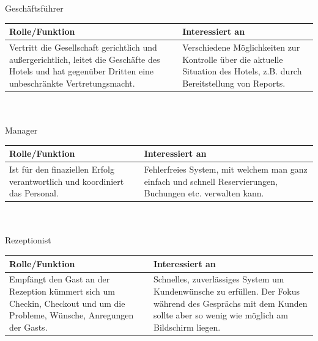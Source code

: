 \documentclass[10pt,a4paper,titlepage]{article}
\begin{document}
Geschäftsführer\\
\begin{tabular}[t]{|p{5cm}|p{5cm}|}
    \hline
    \textbf{Rolle\slash{}Funktion} & \textbf{Interessiert an} \\
    \hline
Vertritt die Gesellschaft gerichtlich und außergerichtlich, leitet die Geschäfte des Hotels und hat gegenüber Dritten eine unbeschränkte Vertretungsmacht. &
    Verschiedene Möglichkeiten zur Kontrolle über die aktuelle Situation des Hotels, z.B. durch Bereitstellung von Reports.\\
    \hline
\end{tabular}
\\ 
\\ 
Manager\\
\begin{tabular}[t]{|p{5cm}|p{5cm}|}
    \hline
    \textbf{Rolle\slash{}Funktion} & \textbf{Interessiert an} \\
    \hline
Ist für den finaziellen Erfolg verantwortlich und koordiniert das Personal. &
	Fehlerfreies System, mit welchem man ganz einfach und schnell Reservierungen, Buchungen etc. verwalten kann. \\
    \hline
\end{tabular}
\\ 
\\ 
\Gls{Rezeptionist}\\
\begin{tabular}[t]{|p{5cm}|p{5cm}|}
    \hline
    \textbf{Rolle\slash{}Funktion} & \textbf{Interessiert an} \\
    \hline
Empfängt den \Gls{Gast} an der \Gls{Rezeption} kümmert sich um \Gls{Checkin}, \Gls{Checkout} und um die Probleme, Wünsche, Anregungen der \Glspl{Gast}. &
	Schnelles, zuverlässiges System um Kundenwünsche zu erfüllen. Der Fokus während des Gesprächs mit dem \Gls{Kunde}n sollte aber so wenig wie möglich am Bildschirm liegen. \\
    \hline
\end{tabular}
\end{document}
